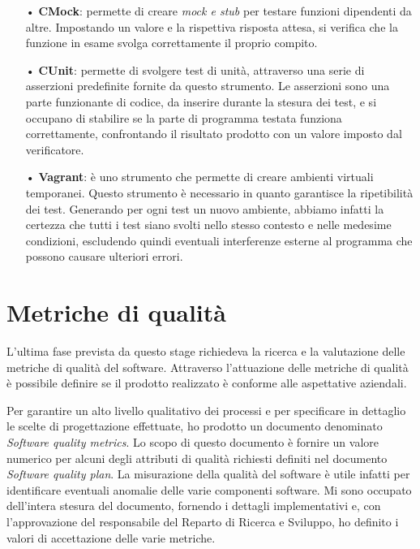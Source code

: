 \begin{itemize}
\item[•] \textbf{CMock}: permette di creare \textit{mock e stub} per testare funzioni dipendenti da altre. Impostando un valore e la rispettiva risposta attesa, si verifica che la funzione in esame svolga correttamente il proprio compito.

\item[•] \textbf{CUnit}: permette di svolgere test di unità, attraverso una serie di asserzioni predefinite fornite da questo strumento. Le asserzioni sono una parte funzionante di codice, da inserire durante la stesura dei test, e si occupano di stabilire se la parte di programma testata funziona correttamente, confrontando il risultato prodotto con un valore imposto dal verificatore.

\item[•] \textbf{Vagrant}: è uno strumento che permette di creare ambienti virtuali temporanei. Questo strumento è necessario in quanto garantisce la ripetibilità dei test. Generando per ogni test un nuovo ambiente, abbiamo infatti la certezza che tutti i test siano svolti nello stesso contesto e nelle medesime condizioni, escludendo quindi eventuali interferenze esterne al programma che possono causare ulteriori errori.
\end{itemize}

\section{Metriche di qualità}

L'ultima fase prevista da questo stage richiedeva la ricerca e la valutazione delle metriche di qualità del software.
Attraverso l'attuazione delle metriche di qualità è possibile definire se il prodotto realizzato è conforme alle aspettative aziendali.

Per garantire un alto livello qualitativo dei processi e per specificare in dettaglio le scelte di progettazione effettuate, ho prodotto un documento denominato \textit{Software quality metrics}.
Lo scopo di questo documento è fornire un valore numerico per alcuni degli attributi di qualità richiesti definiti nel documento \textit{Software quality plan}. La misurazione della qualità del software è utile infatti per identificare eventuali anomalie delle varie componenti software. Mi sono occupato dell'intera stesura del documento, fornendo i dettagli implementativi e, con l'approvazione del responsabile del Reparto di Ricerca e Sviluppo, ho definito i valori di accettazione delle varie metriche.

